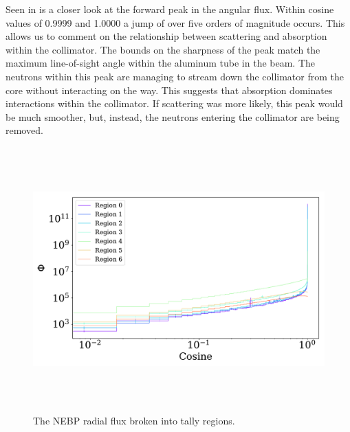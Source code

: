 Seen in  is a closer look at the forward peak in the angular flux.
Within cosine values of 0.9999 and 1.0000 a jump of over five orders of magnitude occurs.
This allows us to comment on the relationship between scattering and absorption within the collimator.
The bounds on the sharpness of the peak match the maximum line-of-sight angle within the aluminum tube in the beam.
The neutrons within this peak are managing to stream down the collimator from the core without interacting on the way.
This suggests that absorption dominates interactions within the collimator.
If scattering was more likely, this peak would be much smoother, but, instead, the neutrons entering the collimator are being removed.


\begin{figure}[htb]
\centering
\includegraphics[height=4in]{tex/figures/flux_rad_cos.pdf}
\caption[Regional Flux vs. Angle]{The NEBP radial flux broken into tally regions.}
\label{fig:flux_rad_cos}
\end{figure}

